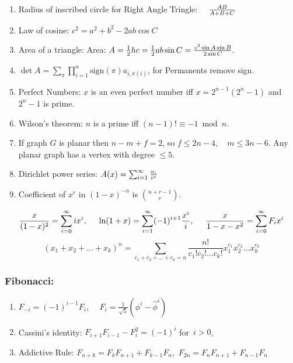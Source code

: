 \documentclass[12pt]{extarticle}
\begin{document}
\begin{multicols*}{2}
			\begin{enumerate}
				\item 			Radius of inscribed circle for Right Angle Tringle:
				$\quad {A B \over A + B + C}$
				\item Law of cosine: 			$c^2 = a^2 + b^2 - 2ab \cos C$
				\item Area of a triangle: Area:
				$A = \frac{1}{2} h c
					= \frac{1}{2} a b \sin C
					= {c^2 \sin A \sin B \over 2 \sin C}.$
				\item 			$\det A = \sum_\pi \prod_{i=1}^n \text{sign}(\pi) a_{i,\pi(i)}$, 
				for Permanents remove sign.
				\item Perfect Numbers: $x$ is an even perfect number iff $x = 2^{n-1}(2^n - 1)$ and $2^n - 1$ is prime.
				\item Wilson's theorem: $n$ is a prime iff
				$(n-1)! \equiv -1 \bmod n.$
				\item If graph $G$ is planar then $n - m + f = 2$, so
				$f \leq 2n - 4, \quad m \leq 3 n - 6.$
				Any planar graph has a vertex with degree $\leq 5$.
				\item Dirichlet power series:
				$A(x) =\sum_{i=1}^\infty{a_i \over i^x}$
				\item Coefficient of $x^r$ in $(1-x)^{-n}$ is ${n+r-1}\choose{r}$.
			\end{enumerate}
			$$ {x \over (1 - x)^2} = \sum_{i=0}^\infty i x^i, \hspace{5mm}
			\ln (1 + x) = \sum_{i=1}^\infty (-1)^{i+1} {x^i \over i}, \hspace{5mm} {x \over 1 - x - x^2} = \sum_{i=0}^\infty F_i x^i$$
			$$(x_1 + x_2 + ... + x_k)^n = \sum_{c_1 + c_2 + ... + c_k = n}
			\frac{n!}{c_1! c_2! ... c_k!} x_1^{c_1} x_2^{c_2} ... x_k^{c_k}$$
			
		
		\subsubsection*{Fibonacci:}
		\begin{enumerate}
		\item $F_{-i} = (-1)^{i-1} F_i$,  $ \quad F_i = \frac{1}{\sqrt{5}} \left(\phi^i - \hat{\phi}^i\right)$
		\item Cassini's identity: $F_{i+1} F_{i-1} - F^2_i = (-1)^i$ \quad \hbox{for $i > 0$,}
		\item Addictive Rule:
		\hspace{2mm}
		$F_{n+k} = F_k F_{n+1} + F_{k-1} F_n,$ \hspace{2mm}
		$F_{2n} = F_n F_{n+1} + F_{n-1} F_n$
		

\end{enumerate}
\end{multicols*}
\end{document}
